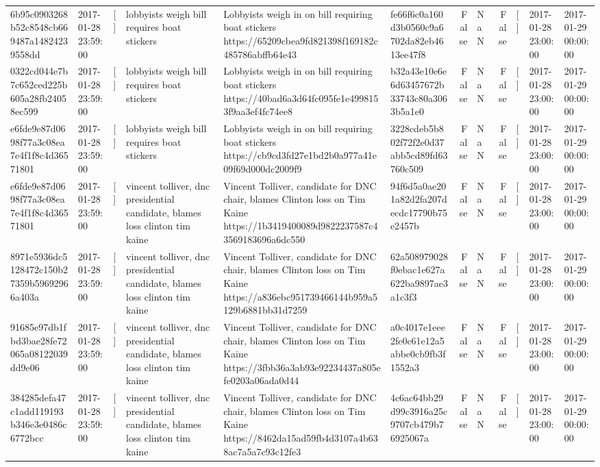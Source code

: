 \begin{tabular}{llllllrlrlll}
6b95c0903268b52c8548cb669487a14824239558dd & 2017-01-28 23:59:00 & [] & lobbyists weigh bill requires boat stickers & Lobbyists weigh in on bill requiring boat stickers https://65209cbea9fd821398f169182c485786abffb64e43 & fe66f6c0a160d3b0560c9a6702da82eb4613ee47f8 & False & NaN & False & [] & 2017-01-28 23:00:00 & 2017-01-29 00:00:00 \\
0322cd044e7b7c652ced225b605a28fb24058ec599 & 2017-01-28 23:59:00 & [] & lobbyists weigh bill requires boat stickers & Lobbyists weigh in on bill requiring boat stickers https://40bad6a3d64fc095fe1e4998153f9aa3ef4fc74ee8 & b32a43e10e6e6d63457672b33743c80a3063b5a1e0 & False & NaN & False & [] & 2017-01-28 23:00:00 & 2017-01-29 00:00:00 \\
e6fde9e87d0698f77a3c08ea7e4f1f8c4d36571801 & 2017-01-28 23:59:00 & [] & lobbyists weigh bill requires boat stickers & Lobbyists weigh in on bill requiring boat stickers https://cb9cd3fd27e1bd2b0a977a41e09f69d000dc2009f9 & 3228cdeb5b802f72f2e0d37abb5cd89fd63760c509 & False & NaN & False & [] & 2017-01-28 23:00:00 & 2017-01-29 00:00:00 \\
e6fde9e87d0698f77a3c08ea7e4f1f8c4d36571801 & 2017-01-28 23:59:00 & [] & vincent tolliver, dnc presidential candidate, blames loss clinton tim kaine & Vincent Tolliver, candidate for DNC chair, blames Clinton loss on Tim Kaine https://1b3419400089d9822237587c43569183696a6dc550 & 94f6d5a0ae201a82d2fa207decdc17790b75e2457b & False & NaN & False & [] & 2017-01-28 23:00:00 & 2017-01-29 00:00:00 \\
8971e5936dc5128472c150b27359b59692966a403a & 2017-01-28 23:59:00 & [] & vincent tolliver, dnc presidential candidate, blames loss clinton tim kaine & Vincent Tolliver, candidate for DNC chair, blames Clinton loss on Tim Kaine https://a836ebc951739466144b959a5129b6881bb31d7259 & 62a508979028f0ebac1e627a622ba9897ae3a1c3f3 & False & NaN & False & [] & 2017-01-28 23:00:00 & 2017-01-29 00:00:00 \\
91685e97db1fbd3bae28fe72065a08122039dd9e06 & 2017-01-28 23:59:00 & [] & vincent tolliver, dnc presidential candidate, blames loss clinton tim kaine & Vincent Tolliver, candidate for DNC chair, blames Clinton loss on Tim Kaine https://3fbb36a3ab93e92234437a805efe0203a06ada0d44 & a0c4017e1eee2fe0c61e12a5abbe0cb9fb3f1552a3 & False & NaN & False & [] & 2017-01-28 23:00:00 & 2017-01-29 00:00:00 \\
384285defa47c1add119193b346e3e0486c6772bcc & 2017-01-28 23:59:00 & [] & vincent tolliver, dnc presidential candidate, blames loss clinton tim kaine & Vincent Tolliver, candidate for DNC chair, blames Clinton loss on Tim Kaine https://8462da15ad59fb4d3107a4b638ac7a5a7c93c12fe3 & 4c6ac64bb29d99c3916a25c9707cb479b76925067a & False & NaN & False & [] & 2017-01-28 23:00:00 & 2017-01-29 00:00:00 \\

\end{tabular}
